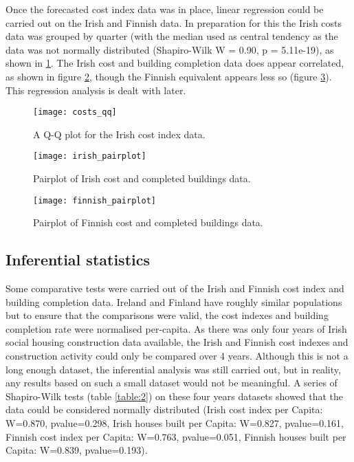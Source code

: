 \documentclass[hidelinks,12pt,oneside]{report} %
\begin{document}
Once the forecasted cost index data was in place, linear regression could be carried out on the Irish and Finnish data. In preparation for this the Irish costs data was grouped by quarter (with the median used as central tendency as the data was not normally distributed (Shapiro-Wilk W = 0.90, p = 5.11e-19), as shown in \ref{fig:costs_qq}. The Irish cost and building completion data does appear correlated, as shown in figure \ref{fig:irish_pairplot}, though the Finnish equivalent appears less so (figure \ref{fig:finnish_pairplot}). This regression analysis is dealt with later.

\begin{figure}[!ht]
	\centering
	\vspace{.4218cm}
		\texttt{[image: costs\_qq]}	\captionsetup{justification=justified,width=1\linewidth}
	\caption{A Q-Q plot for the Irish cost index data.}
\label{fig:costs_qq}
\end{figure}

\begin{figure}[!ht]
	\centering
	\vspace{.4218cm}
		\texttt{[image: irish\_pairplot]}	\captionsetup{justification=justified,width=1\linewidth}
	\caption{Pairplot of Irish cost and completed buildings data.}
\label{fig:irish_pairplot}
\end{figure}

\begin{figure}[!ht]
	\centering
	\vspace{.4218cm}
		\texttt{[image: finnish\_pairplot]}	\captionsetup{justification=justified,width=1\linewidth}
	\caption{Pairplot of Finnish cost and completed buildings data.}
\label{fig:finnish_pairplot}
\end{figure}

\subsection{Inferential statistics}
Some comparative tests were carried out of the Irish and Finnish cost index and building completion data. Ireland and Finland have roughly similar populations \citep{eurostat} but to ensure that the comparisons were valid, the cost indexes and building completion rate were normalised per-capita. As there was only four years of Irish social housing construction data available, the Irish and Finnish cost indexes and construction activity could only be compared over 4 years. Although this is not a long enough dataset, the inferential analysis was still carried out, but in reality, any results based on such a small dataset would not be meaningful. A series of Shapiro-Wilk tests (table \ref{table:2}) on these four years datasets showed that the data could be considered normally distributed (Irish cost index per Capita: W=0.870, pvalue=0.298, Irish houses built per Capita: W=0.827, pvalue=0.161, Finnish cost index per Capita: W=0.763, pvalue=0.051, Finnish houses built per Capita: W=0.839, pvalue=0.193).
\end{document}
